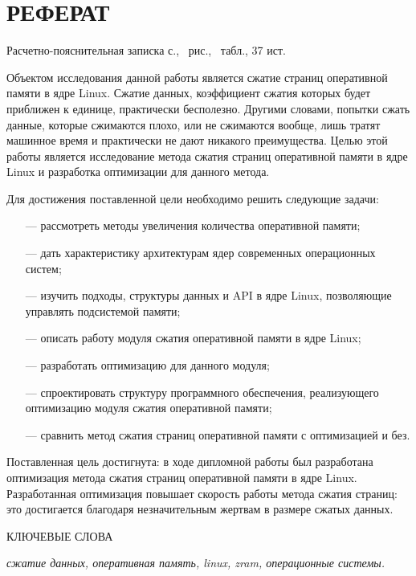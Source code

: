 \section*{РЕФЕРАТ}

Расчетно-пояснительная записка \pageref{LastPage} с., \totalfigures\ рис., \totaltables\ табл., 37 ист.

Объектом исследования данной работы является сжатие страниц оперативной памяти в ядре Linux. Сжатие данных, коэффициент сжатия которых будет приближен к единице, практически бесполезно. Другими словами, попытки сжать данные, которые сжимаются плохо, или не сжимаются вообще, лишь тратят машинное время и практически не дают никакого преимущества. Целью этой работы является исследование метода сжатия страниц оперативной памяти в ядре Linux и разработка оптимизации для данного метода.

Для достижения поставленной цели необходимо решить следующие задачи:

\begin{itemize}[leftmargin=1.6\parindent]
	\item [---] рассмотреть методы увеличения количества оперативной памяти;
	\item [---] дать характеристику архитектурам ядер современных операционных систем;
	\item [---] изучить подходы, структуры данных и API \cite{api} в ядре Linux, позволяющие управлять подсистемой памяти;
	\item [---] описать работу модуля сжатия оперативной памяти в ядре Linux;
	\item [---] разработать оптимизацию для данного модуля;
	\item [---] спроектировать структуру программного обеспечения, реализующего оптимизацию модуля сжатия оперативной памяти;
	\item [---] сравнить метод сжатия страниц оперативной памяти с оптимизацией и без.
\end{itemize}

Поставленная цель достигнута: в ходе дипломной работы был разработана оптимизация метода сжатия страниц оперативной памяти в ядре Linux. Разработанная оптимизация повышает скорость работы метода сжатия страниц: это достигается благодаря незначительным жертвам в размере сжатых данных.

КЛЮЧЕВЫЕ СЛОВА

\textit{сжатие данных, оперативная память, linux, zram, операционные системы.}

\pagebreak